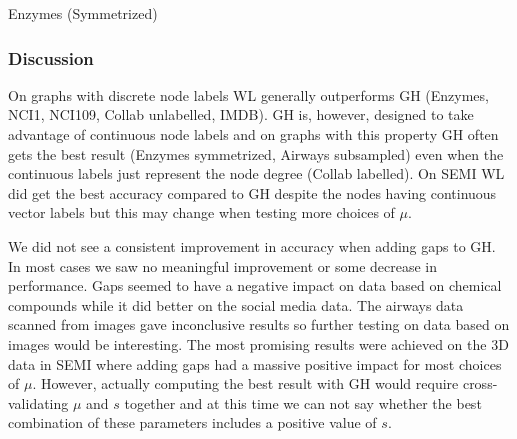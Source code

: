 \documentclass{article}
\begin{document}
Enzymes (Symmetrized) \\
\fi

\subsubsection{Discussion}
On graphs with discrete node labels WL generally outperforms GH (Enzymes, NCI1, NCI109, Collab unlabelled, IMDB). GH is, however, designed to take advantage of continuous node labels and on graphs with this property GH often gets the best result (Enzymes symmetrized, Airways subsampled) even when the continuous labels just represent the node degree (Collab labelled). On SEMI WL did get the best accuracy compared to GH despite the nodes having continuous vector labels but this may change when testing more choices of $\mu$.

We did not see a consistent improvement in accuracy when adding gaps to GH. In most cases we saw no meaningful improvement or some decrease in performance. Gaps seemed to have a negative impact on data based on chemical compounds while it did better on the social media data. The airways data scanned from images gave inconclusive results so further testing on data based on images would be interesting. The most promising results were achieved on the 3D data in SEMI where adding gaps had a massive positive impact for most choices of $\mu$. However, actually computing the best result with GH would require cross-validating $\mu$ and $s$ together and at this time we can not say whether the best combination of these parameters includes a positive value of $s$.
\end{document}
